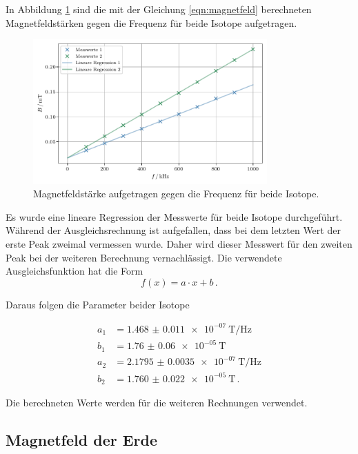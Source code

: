 In Abbildung \ref{fig:plot1} sind die mit der Gleichung \ref{eqn:magnetfeld} berechneten Magnetfeldstärken gegen die Frequenz für beide Isotope aufgetragen.

\begin{figure}
    \centering
    \includegraphics[width=0.8\textwidth]{build/plot.pdf}
    \caption{Magnetfeldstärke aufgetragen gegen die Frequenz für beide Isotope.}
    \label{fig:plot1}
\end{figure}

Es wurde eine lineare Regression der Messwerte für beide Isotope durchgeführt.
Während der Ausgleichsrechnung ist aufgefallen, dass bei dem letzten Wert der erste Peak zweimal vermessen wurde.
Daher wird dieser Messwert für den zweiten Peak bei der weiteren Berechnung vernachlässigt.
Die verwendete Ausgleichsfunktion hat die Form
\begin{equation}
    f(x) = a \cdot x + b \, .
\end{equation}

Daraus folgen die Parameter beider Isotope

\begin{align*}
    a_1 &= \qty{1.468(11)e-07}{\tesla\per\hertz} \\
    b_1 &= \qty{1.76(6)e-05}{\tesla} \\
    a_2 &= \qty{2.1795(35)e-07}{\tesla\per\hertz} \\
    b_2 &= \qty{1.760(22)e-05}{\tesla} \, .
\end{align*}

Die berechneten Werte werden für die weiteren Rechnungen verwendet.

\subsection{Magnetfeld der Erde}
\label{sec:magnetfeld-der-erde}

